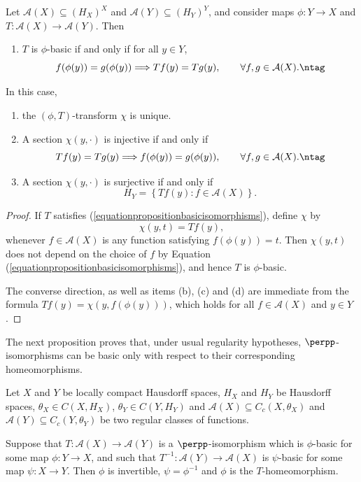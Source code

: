 \begin{proposition}\label{propositionbasicisomorphisms}
Let $\mathcal{A}(X)\subseteq (H_X)^X$ and $\mathcal{A}(Y)\subseteq (H_Y)^Y$, and consider maps $\phi:Y\to X$ and $T:\mathcal{A}(X)\to\mathcal{A}(Y)$. Then
\begin{enumerate}
\item[(a)] $T$ is $\phi$-basic if and only if for all $y\in Y$,
\[f(\phi(y))=g(\phi(y))\Longrightarrow Tf(y)=Tg(y),\qquad\forall f,g\in\mathcal{A}(X).\ntag\label{equationpropositionbasicisomorphisms}\]
\end{enumerate}
In this case,
\begin{enumerate}
\item[(b)] the $(\phi,T)$-transform $\chi$ is unique.
\item[(c)] A section $\chi(y,\cdot)$ is injective if and only if
\[Tf(y)=Tg(y)\Longrightarrow f(\phi(y))=g(\phi(y)),\qquad\forall f,g\in\mathcal{A}(X).\ntag\label{equationpropositionbasicisomorphisms2}\]
\item[(d)] A section $\chi(y,\cdot)$ is surjective if and only if
\[H_Y=\left\{Tf(y):f\in\mathcal{A}(X)\right\}.\]
\end{enumerate}
\end{proposition}
\begin{proof}
If $T$ satisfies (\ref{equationpropositionbasicisomorphisms}), define $\chi$ by
\[\chi(y,t)=Tf(y),\]
whenever $f\in\mathcal{A}(X)$ is any function satisfying $f(\phi(y))=t$. Then $\chi(y,t)$ does not depend on the choice of $f$ by Equation (\ref{equationpropositionbasicisomorphisms}), and hence $T$ is $\phi$-basic.

The converse direction, as well as items (b), (c) and (d) are immediate from the formula $Tf(y)=\chi(y,f(\phi(y)))$, which holds for all $f\in\mathcal{A}(X)$ and $y\in Y$.\qedhere
\end{proof}

The next proposition proves that, under usual regularity hypotheses, $\perpp$-\hspace*{0pt}isomorphisms can be basic only with respect to their corresponding homeomorphisms.

\begin{proposition}\label{propositionuniquemapwhichmakesbasicisthomeomorphism}
Let $X$ and $Y$ be locally compact Hausdorff spaces, $H_X$ and $H_Y$ be Hausdorff spaces, $\theta_X\in C(X,H_X)$, $\theta_Y\in C(Y,H_Y)$ and $\mathcal{A}(X)\subseteq C_c(X,\theta_X)$ and $\mathcal{A}(Y)\subseteq C_c(Y,\theta_Y)$ be two regular classes of functions.

Suppose that $T:\mathcal{A}(X)\to\mathcal{A}(Y)$ is a $\perpp$-isomorphism which is $\phi$-basic for some map $\phi:Y\to X$, and such that $T^{-1}:\mathcal{A}(Y)\to\mathcal{A}(X)$ is $\psi$-basic for some map $\psi:X\to Y$. Then $\phi$ is invertible, $\psi=\phi^{-1}$ and $\phi$ is the $T$-homeomorphism.
\end{proposition}

